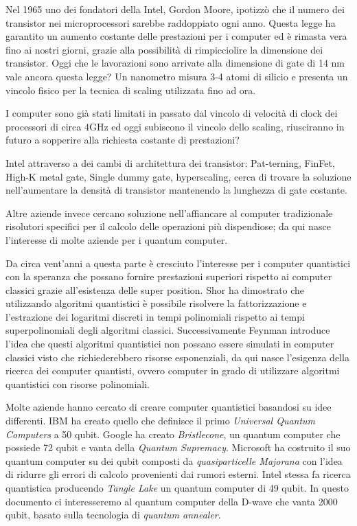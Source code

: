\cite{S24}Nel 1965 uno dei fondatori della Intel, Gordon Moore, ipotizzò che il numero dei transistor nei microprocessori sarebbe raddoppiato ogni anno. Questa legge ha garantito un aumento costante delle prestazioni per i computer ed è rimasta vera fino ai nostri giorni, grazie alla possibilità di rimpicciolire la dimensione dei transistor. Oggi che le lavorazioni sono arrivate alla dimensione di gate di 14 nm vale ancora questa legge? Un nanometro misura 3-4 atomi di silicio e presenta un vincolo fisico per la tecnica di scaling utilizzata fino ad ora.

I computer sono già stati limitati in passato dal vincolo di velocità di clock dei processori di circa 4GHz ed oggi subiscono il vincolo dello scaling, riusciranno in futuro a sopperire alla richiesta costante di prestazioni?

Intel attraverso a dei cambi di architettura dei transistor: Pat-terning, FinFet, High-K metal gate, Single dummy gate, hyperscaling, cerca di trovare la soluzione nell'aumentare la densità di transistor mantenendo la lunghezza di gate costante.

Altre aziende invece cercano soluzione nell'affiancare al computer tradizionale risolutori specifici per il calcolo delle operazioni più dispendiose; da qui nasce l'interesse di molte aziende per i quantum computer.

\cite{NAC}Da circa vent'anni a questa parte è cresciuto l'interesse per i computer quantistici con la speranza che possano fornire prestazioni superiori rispetto ai computer classici grazie all'esistenza delle super position. Shor ha dimostrato che utilizzando algoritmi quantistici è possibile risolvere la fattorizzazione e l'estrazione dei logaritmi discreti in tempi polinomiali rispetto ai tempi superpolinomiali degli algoritmi classici. Successivamente Feynman introduce l'idea che questi algoritmi quantistici non possano essere simulati in computer classici visto che richiederebbero risorse esponenziali, da qui nasce l'esigenza della ricerca dei computer quantisti, ovvero computer in grado di utilizzare algoritmi quantistici con risorse polinomiali.

Molte aziende hanno cercato di creare computer quantistici basandosi su idee differenti. IBM ha creato quello che definisce il primo \textit{Universal Quantum Computers} a 50 qubit. Google ha creato \textit{Bristlecone}, un quantum computer che possiede 72 qubit e vanta della \textit{Quantum Supremacy}. Microsoft ha costruito il suo quantum computer su dei qubit composti da \textit{quasiparticelle Majorana} con l'idea di ridurre gli errori di calcolo provenienti dai rumori esterni. Intel stessa fa ricerca quantistica producendo \textit{Tangle Lake} un quantum computer di 49 qubit. In questo documento ci interesseremo al quantum computer della D-wave che vanta 2000 qubit, basato sulla tecnologia di \textit{quantum annealer}.
